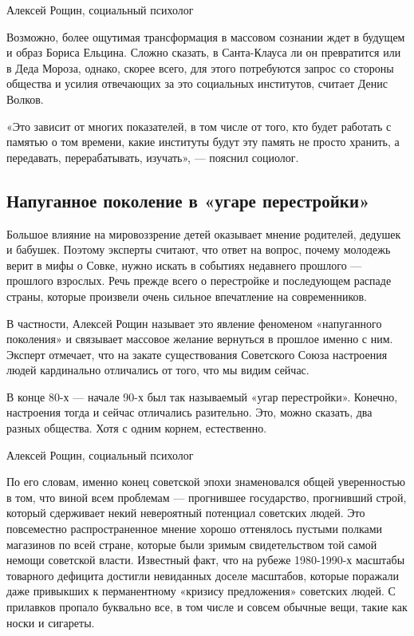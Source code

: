 Алексей Рощин, социальный психолог

Возможно, более ощутимая трансформация в массовом сознании ждет в будущем и
образ Бориса Ельцина. Сложно сказать, в Санта-Клауса ли он превратится или в
Деда Мороза, однако, скорее всего, для этого потребуются запрос со стороны
общества и усилия отвечающих за это социальных институтов, считает Денис
Волков.

«Это зависит от многих показателей, в том числе от того, кто будет работать с
памятью о том времени, какие институты будут эту память не просто хранить, а
передавать, перерабатывать, изучать», --- пояснил социолог.

\subsection{Напуганное поколение в «угаре перестройки»}

Большое влияние на мировоззрение детей оказывает мнение родителей, дедушек и
бабушек. Поэтому эксперты считают, что ответ на вопрос, почему молодежь верит в
мифы о Совке, нужно искать в событиях недавнего прошлого --- прошлого взрослых.
Речь прежде всего о перестройке и последующем распаде страны, которые произвели
очень сильное впечатление на современников.

В частности, Алексей Рощин называет это явление феноменом «напуганного
поколения» и связывает массовое желание вернуться в прошлое именно с ним.
Эксперт отмечает, что на закате существования Советского Союза настроения людей
кардинально отличались от того, что мы видим сейчас.

В конце 80-х --- начале 90-х был так называемый «угар перестройки». Конечно,
настроения тогда и сейчас отличались разительно. Это, можно сказать, два разных
общества. Хотя с одним корнем, естественно.

Алексей Рощин, социальный психолог

По его словам, именно конец советской эпохи знаменовался общей уверенностью в
том, что виной всем проблемам --- прогнившее государство, прогнивший строй,
который сдерживает некий невероятный потенциал советских людей. Это повсеместно
распространенное мнение хорошо оттенялось пустыми полками магазинов по всей
стране, которые были зримым свидетельством той самой немощи советской власти.
Известный факт, что на рубеже 1980-1990-х масштабы товарного дефицита достигли
невиданных доселе масштабов, которые поражали даже привыкших к перманентному
«кризису предложения» советских людей. С прилавков пропало буквально все, в том
числе и совсем обычные вещи, такие как носки и сигареты.

